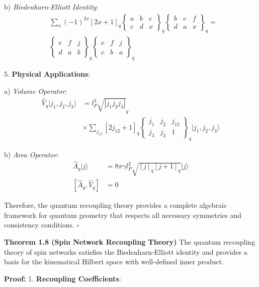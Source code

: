 \documentclass[12pt,a4paper]{article}
\begin{document}
   b) \textit{Biedenharn-Elliott Identity}:
      \[
      \begin{aligned}
      &\sum_{x} (-1)^{2x} [2x+1]_q \begin{Bmatrix} a & b & e \\ c & d & x \end{Bmatrix}_q \begin{Bmatrix} b & c & f \\ d & a & x \end{Bmatrix}_q = \\
      &\begin{Bmatrix} e & f & j \\ d & a & b \end{Bmatrix}_q \begin{Bmatrix} e & f & j \\ c & b & a \end{Bmatrix}_q
      \end{aligned}
      \]

5. \textbf{Physical Applications}:
   
   a) \textit{Volume Operator}:
      \[
      \begin{aligned}
      \hat{V}_q|j_1,j_2,j_3\rangle &= l_P^3\sqrt{|j_1j_2j_3|}_q \\
      &\times \sum_{j_{12}} [2j_{12}+1]_q \begin{Bmatrix} j_1 & j_2 & j_{12} \\ j_3 & j_3 & 1 \end{Bmatrix}_q |j_1,j_2,j_3\rangle
      \end{aligned}
      \]
   
   b) \textit{Area Operator}:
      \[
      \begin{aligned}
      \hat{A}_q|j\rangle &= 8\pi\gamma l_P^2\sqrt{[j]_q[j+1]_q}|j\rangle \\
      [\hat{A}_q, \hat{V}_q] &= 0
      \end{aligned}
      \]

Therefore, the quantum recoupling theory provides a complete algebraic framework for quantum geometry that respects all necessary symmetries and consistency conditions. $\square$

\textbf{Theorem 1.8 (Spin Network Recoupling Theory)}
The quantum recoupling theory of spin networks satisfies the Biedenharn-Elliott identity and provides a basis for the kinematical Hilbert space with well-defined inner product.

\textbf{Proof:}
1. \textbf{Recoupling Coefficients}:
   
\end{document}
